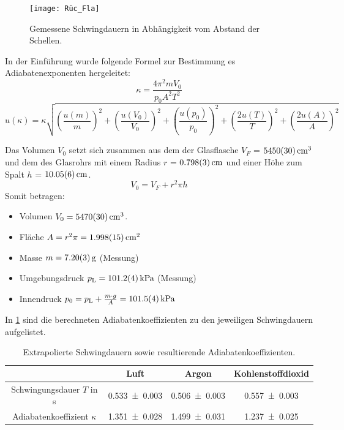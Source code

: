 \documentclass[
	a4paper,
	12pt,
	pagesize,
	ngerman
]{scrartcl}
\begin{document}
	\begin{figure}[H]
		\texttt{[image: Rüc\_Fla]}
		\centering
		\caption{Gemessene Schwingdauern in Abhängigkeit vom Abstand der Schellen.}
		\label{fig_Rüc_Fla}
		\centering
	\end{figure} 

	In der Einführung wurde folgende Formel zur Bestimmung es Adiabatenexponenten hergeleitet:
	\begin{equation}
	\kappa = \frac{4\pi^2mV_0}{p_0 A^2 T^2}
	\label{eq_Rüc_Fla_Kappa}
	\end{equation}
	\begin{equation}
	u(\kappa) = \kappa \sqrt{\left(\frac{u(m)}{m}\right)^2+\left(\frac{u(V_0)}{V_0}\right)^2+\left(\frac{u(p_0)}{p_0}\right)^2+\left(\frac{2u(T)}{T}\right)^2+\left(\frac{2u(A)}{A}\right)^2}
	\end{equation}
	
	Das Volumen $V_0$ setzt sich zusammen aus dem der Glasflasche $V_F$ = $\SI{5450+-30}{cm^3}$ und dem des Glasrohrs mit einem Radius $r$ = $\SI{0,798+-0,003}{cm}$ und einer Höhe zum Spalt $h$ = $\SI{10,05+-0.06}{cm}$.
	\begin{equation}
		V_0 = V_F + r^2 \pi h
	\end{equation}
	Somit betragen:
	\begin{itemize}
		\item Volumen $V_0 = \SI{5470+-30}{cm^3}$.
		\item Fläche $A = r^2\pi = \SI{1,998+-0,015}{cm^2}$
		\item Masse $m = \SI{7,2+-0,03}{g}$ (Messung)
		\item Umgebungsdruck $p_\text{L}=\SI{101,2+-0,4}{kPa}$ (Messung)
		\item Innendruck $p_0 = p_\text{L} + \frac{m\cdot g}{A} = \SI{101,5+-0,4}{kPa}$ 
	\end{itemize}
	In \cref{tab_Rüc_Fla} sind die berechneten Adiabatenkoeffizienten zu den jeweiligen Schwingdauern aufgelistet.
	
	\begin{table}[H]
		\centering
		\begin{tabular}{ c | c | c | c}
			&Luft & Argon  & Kohlenstoffdioxid\\ \hline
			Schwingungsdauer $T$ in s&\SI{0,533+-0,003}{}&\SI{0,506+-0,003}{} & \SI{0,557+-0,003}{}\\
			Adiabatenkoeffizient $\kappa$ &\SI{1,351+-0,028}{}&\SI{1,499+-0,031}{}&\SI{1,237+-0,025}{}\\
		\end{tabular}
		\caption{Extrapolierte Schwingdauern sowie resultierende Adiabatenkoeffizienten.}
		\label{tab_Rüc_Fla} 
	\end{table}
	
\end{document}
